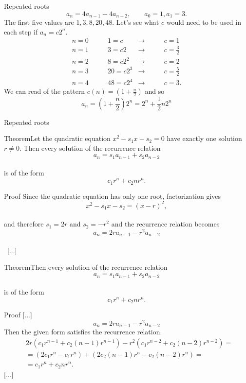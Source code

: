 \documentclass{beamer}
\def\bl[#1]#2{\begin{block}{#1}#2\end{block}}
\begin{document}
\begin{frame}{Repeated roots}
\[
a_n=4a_{n-1}-4a_{n-2},\qquad a_0=1,a_1=3.
\]
The first five values are $1,3,8,20,48$. Let's see what $c$ would need to be used in each step if $a_n=c 2^n$.
\begin{align*}
n=0&\qquad 1=c&\to&\qquad c=1\\
n=1&\qquad 3=c2&\to& \qquad c=\frac{3}{2}\\
n=2&\qquad 8=c2^2&\to&\qquad c=2\\
n=3&\qquad 20=c2^3&\to&\qquad c=\frac{5}{2}\\
n=4&\qquad 48=c2^4&\to&\qquad c=3.
\end{align*}
We can read of the pattern $c(n)=(1+\frac{n}{2})$ and so
\[
a_n=\left(1+\frac{n}{2}\right) 2^n=2^n+\frac{1}{2}n2^n
\]
\end{frame}

\begin{frame}{Repeated roots}
\bl[Theorem]{Let the quadratic equation $x^2-s_1x-s_2=0$ have exactly one solution $r\neq 0$. Then every solution of the recurrence relation\vspace{-0.2cm}
\[
a_n=s_1a_{n-1}+s_2a_{n-2}
\]\vspace{-0.6cm}\\
is of the form\vspace{-0.2cm}
\[
c_1r^n+c_2nr^n.
\]}
\bl[Proof]{
Since the quadratic equation has only one root, factorization gives\vspace{-0.2cm}
\[
x^2-s_1x-s_2=(x-r)^2,
\]\vspace{-0.4cm}\\
and therefore $s_1=2r$ and $s_2=-r^2$ and the recurrence relation becomes\vspace{-0.2cm}
\[
a_n=2ra_{n-1}-r^2a_{n-2}
\]\vspace{-0.8cm}\\
~[...]}


\end{frame}

\begin{frame}
\bl[Theorem]{Then every solution of the recurrence relation\vspace{-0.2cm}
\[
a_n=s_1a_{n-1}+s_2a_{n-2}
\]\vspace{-0.6cm}\\
is of the form\vspace{-0.2cm}
\[
c_1r^n+c_2nr^n.
\]}
\bl[Proof]{
[...]
\[
a_n=2ra_{n-1}-r^2a_{n-2}
\]
Then the given form satisfies the recurrence relation.
\begin{align*}
&2r(c_1r^{n-1}+c_2(n-1)r^{n-1})-r^2(c_1r^{n-2}+c_2(n-2)r^{n-2})=\\
&=(2c_1r^n-c_1r^n)+(2c_2(n-1)r^n-c_2(n-2)r^n)=\\
&=c_1r^n+c_2nr^n.
\end{align*}
[...]}


\end{frame}
\end{document}
